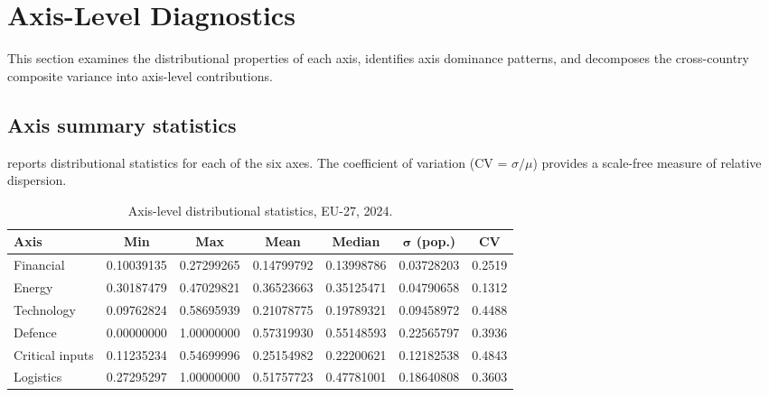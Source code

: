 \section{Axis-Level Diagnostics}\label{sec:axis-diagnostics}

This section examines the distributional properties of each axis,
identifies axis dominance patterns, and decomposes the cross-country
composite variance into axis-level contributions.

\subsection{Axis summary statistics}

 reports distributional statistics for each of
the six axes.  The coefficient of variation (CV = $\sigma / \mu$)
provides a scale-free measure of relative dispersion.

\begin{table}[htbp]
\centering
\caption{Axis-level distributional statistics, EU-27, 2024.}
\label{tab:axis-stats}
\begin{tabular}{@{}lS[table-format=1.8]S[table-format=1.8]
  S[table-format=1.8]S[table-format=1.8]S[table-format=1.8]
  S[table-format=1.4]@{}}
\toprule
{\textbf{Axis}} & {\textbf{Min}} & {\textbf{Max}} & {\textbf{Mean}}
  & {\textbf{Median}} & {$\boldsymbol{\sigma}$ \textbf{(pop.)}}
  & {\textbf{CV}} \\
\midrule
Financial       & 0.10039135 & 0.27299265 & 0.14799792 & 0.13998786 & 0.03728203 & 0.2519 \\
Energy          & 0.30187479 & 0.47029821 & 0.36523663 & 0.35125471 & 0.04790658 & 0.1312 \\
Technology      & 0.09762824 & 0.58695939 & 0.21078775 & 0.19789321 & 0.09458972 & 0.4488 \\
Defence         & 0.00000000 & 1.00000000 & 0.57319930 & 0.55148593 & 0.22565797 & 0.3936 \\
Critical inputs & 0.11235234 & 0.54699996 & 0.25154982 & 0.22200621 & 0.12182538 & 0.4843 \\
Logistics       & 0.27295297 & 1.00000000 & 0.51757723 & 0.47781001 & 0.18640808 & 0.3603 \\
\bottomrule
\end{tabular}
\end{table}

